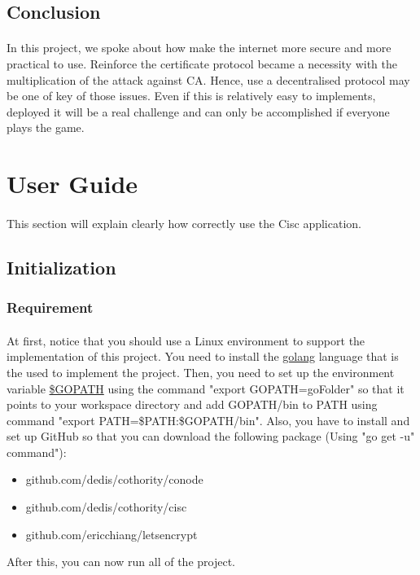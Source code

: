 \documentclass[11pt, a4paper, twoside, openright]{article}
\begin{document}
\subsection{Conclusion}
\paragraph{}In this project, we spoke about how make the internet more secure and more practical to use. Reinforce the certificate protocol became a necessity with the multiplication of the attack against CA. Hence, use a decentralised protocol may be one of key of those issues. Even if this is relatively easy to implements, deployed it will be a real challenge and can only be accomplished if everyone plays the game.  


\section{User Guide}
\paragraph{}This section will explain clearly how correctly use the Cisc application.  
\subsection{Initialization}
\subsubsection{Requirement}
\paragraph{} At first, notice that you should use a Linux environment to support the implementation of this project.
You need to install the \href{ https://golang.org/doc/install}{golang} language that is the used to implement the project. Then, you need to set up the environment variable
\href{ https://golang.org/doc/code.html#GOPATH}{\$GOPATH} using the command "export GOPATH=goFolder" so that it points to your workspace directory and add GOPATH/bin to PATH 
using command "export PATH=\$PATH:\$GOPATH/bin". Also, you have to install and set up GitHub so that you can download the following package (Using "go get -u" command"):
\begin{itemize}
\item github.com/dedis/cothority/conode
\item github.com/dedis/cothority/cisc
\item github.com/ericchiang/letsencrypt
\end{itemize}
After this, you can now run all of the project. 
\end{document}

